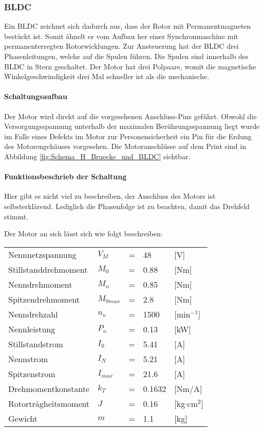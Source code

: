 \subsubsection{BLDC}
\label{subsubsec:BLDC}

Ein BLDC zeichnet sich dadurch aus, dass der Rotor mit Permanentmagneten bestückt ist. Somit ähnelt er vom Aufbau her einer Synchronmaschine mit permanenterregten Rotorwicklungen. Zur Ansteuerung hat der BLDC drei Phasenleitungen, welche auf die Spulen führen. Die Spulen sind innerhalb des BLDC in Stern geschaltet. Der Motor hat drei Polpaare, womit die magnetische Winkelgeschwindigkeit drei Mal schneller ist als die mechanische.

\paragraph{Schaltungsaufbau}\mbox{}

Der Motor wird direkt auf die vorgesehenen Anschluss-Pins geführt. Obwohl die Versorgungsspannung unterhalb der maximalen Berührungsspannung liegt wurde im Falle eines Defekts im Motor zur Personensicherheit ein Pin für die Erdung des Motorengehäuses vorgesehen.
Die Motoranschlüsse auf dem Print sind in Abbildung \ref{fig:Schema_H_Bruecke_und_BLDC} sichtbar.

\paragraph{Funktionsbeschrieb der Schaltung}\mbox{}

Hier gibt es nicht viel zu beschreiben, der Anschluss des Motors ist selbsterklärend. Lediglich die Phasenfolge ist zu beachten, damit das Drehfeld stimmt.

Der Motor an sich lässt sich wie folgt beschreiben:

\begin{tabular}{lllll}
Nennnetzspannung & $V_M$ & = & 48 & [V]\\
Stillstanddrehmoment & $M_0$ & = & 0.88 & [Nm]\\
Nenndrehmoment & $M_n$ & = & 0.85 & [Nm]\\
Spitzendrehmoment & $M_{0max}$ & = & 2.8 & [Nm]\\
Nenndrehzahl & $n_n$ & = & 1500 & [min$^{-1}$]\\
Nennleistung & $P_n$ & = & 0.13 & [kW]\\
Stillstandstrom & $I_0$ & = & 5.41 & [A]\\
Nennstrom & $I_N$ & = & 5.21 & [A]\\
Spitzenstrom & $I_{max}$ & = & 21.6 & [A]\\
Drehmomentkonstante & $k_T$ & = & 0.1632 & [Nm/A]\\
Rotorträgheitsmoment & $J$ & = & 0.16 & [kg$\cdot$cm$^2$]\\
Gewicht & $m$ & = & 1.1 & [kg]\\
\end{tabular}